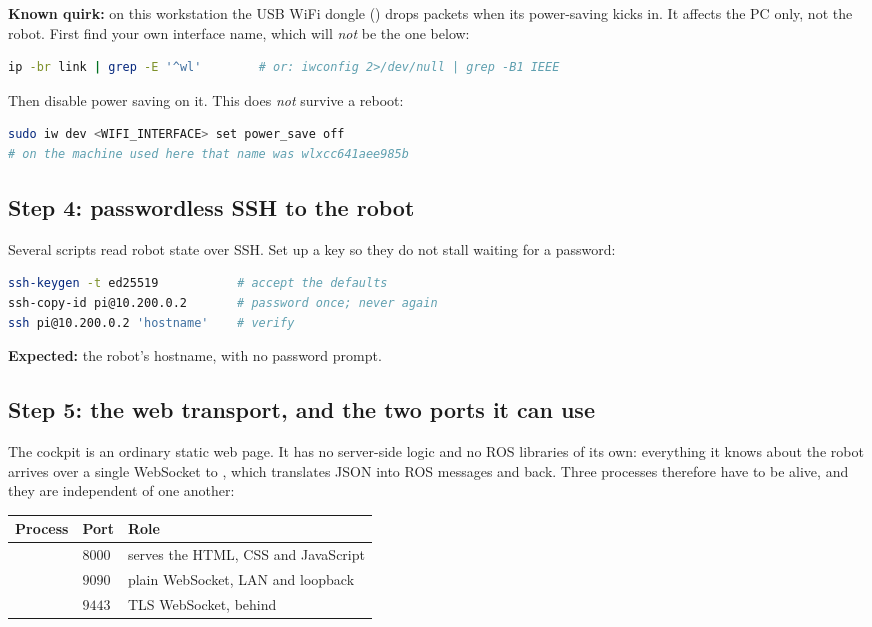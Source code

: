 \noindent \textbf{Known quirk:} on this workstation the USB WiFi dongle
() drops packets when its power-saving kicks in. It affects the
PC only, not the robot. First find your own interface name, which will
\emph{not} be the one below:
\begin{lstlisting}[language=bash]
ip -br link | grep -E '^wl'        # or: iwconfig 2>/dev/null | grep -B1 IEEE
\end{lstlisting}
Then disable power saving on it. This does \emph{not} survive a reboot:
\begin{lstlisting}[language=bash]
sudo iw dev <WIFI_INTERFACE> set power_save off
# on the machine used here that name was wlxcc641aee985b
\end{lstlisting}

\subsection{Step 4: passwordless SSH to the robot}
Several scripts read robot state over SSH. Set up a key so they do not stall
waiting for a password:
\begin{lstlisting}[language=bash]
ssh-keygen -t ed25519           # accept the defaults
ssh-copy-id pi@10.200.0.2       # password once; never again
ssh pi@10.200.0.2 'hostname'    # verify
\end{lstlisting}
\textbf{Expected:} the robot's hostname, with no password prompt.

\subsection{Step 5: the web transport, and the two ports it can use}
\label{ap:repro-webtransport}
The cockpit is an ordinary static web page. It has no server-side logic and no
ROS libraries of its own: everything it knows about the robot arrives over a
single WebSocket to , which translates JSON into ROS messages
and back. Three processes therefore have to be alive, and they are independent
of one another:

\begin{center}
\small
\begin{tabular}{@{}llL{5.6cm}@{}}
\toprule
Process & Port & Role \\
\midrule
{}                      & $8000$ & serves the HTML, CSS and JavaScript \\
              & $9090$ & plain WebSocket, LAN and loopback \\
 & $9443$ & TLS WebSocket, behind  \\
\bottomrule
\end{tabular}
\end{center}

